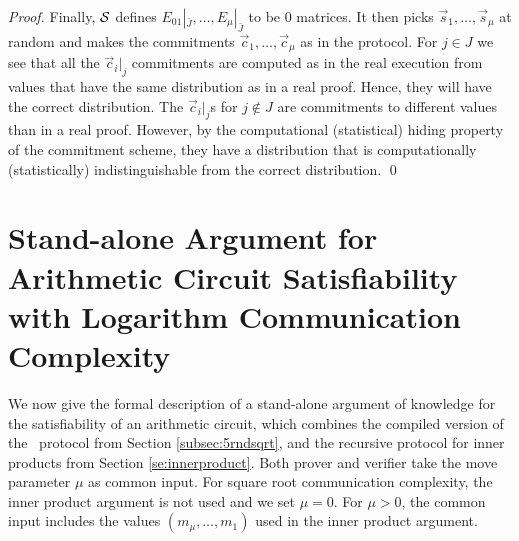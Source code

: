 \begin{proof}
Finally, $\mathcal{S}$ defines $E_{01}|_{\bar{J}},\ldots,E_{\mu}|_{\bar{J}}$ to be $0$ matrices. It then picks $\vec{s}_1,\ldots,\vec{s}_\mu$ at random and makes the commitments $\vec{c}_1,\ldots,\vec{c}_\mu$ as in the protocol. For $j\in J$ we see that all the $\vec{c}_i|_j$ commitments are computed as in the real execution from values that have the same distribution as in a real proof. Hence, they will have the correct distribution. The $\vec{c}_i|_j$s for $j\notin J$ are commitments to different values than in a real proof. However, by the computational (statistical) hiding property of the commitment scheme, they have a distribution that is computationally (statistically) indistinguishable from the correct distribution. \qed
\end{proof}

\chapter{Stand-alone Argument for Arithmetic Circuit Satisfiability with Logarithm Communication Complexity}
\label{appendix:logprot}

We now give the formal description of a stand-alone argument of knowledge for the satisfiability of an arithmetic circuit, which combines the compiled version of the \ILC\ protocol from Section \ref{subsec:5rndsqrt}, and the recursive protocol for inner products from Section \ref{se:innerproduct}. Both prover and verifier take the move parameter $\mu$ as common input. For square root communication complexity, the inner product argument is not used and we set $\mu=0$. For $\mu > 0$, the common input includes the values $(m_\mu,\ldots,m_1)$ used in the inner product argument.

